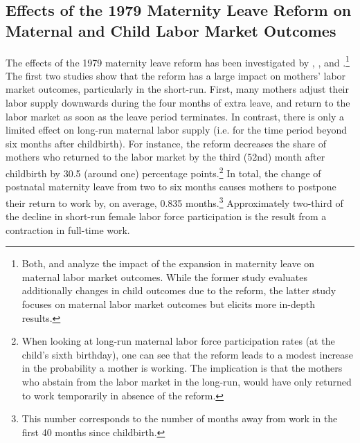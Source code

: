 \documentclass[11pt, a4paper,draft]{article} %
\begin{document}
\subsection[Effects of 1979 Reform on Outcomes]{Effects of the 1979 Maternity Leave Reform on Maternal and Child Labor Market Outcomes}
The effects of the 1979 maternity leave reform has been investigated by \cite{Dustmann2012}, \cite{schonberg2014expansions}, and \cite{guertzgen2018}.\footnote{Both, \cite{Dustmann2012} and \cite{schonberg2014expansions} analyze the impact of the expansion in maternity leave on maternal labor market outcomes. While the former study evaluates additionally changes in child outcomes due to the reform, the latter study focuses on maternal labor market outcomes but elicits more in-depth results.} The first two studies show that the reform has a large impact on mothers' labor market outcomes, particularly in the short-run. \newline First, many mothers adjust their labor supply downwards during the four months of extra leave, and return to the labor market as soon as the leave period terminates. In contrast, there is only a limited effect on long-run maternal labor supply (i.e. for the time period beyond six months after childbirth). For instance, the reform decreases the share of mothers who returned to the labor market by the third (52nd) month after childbirth by 30.5 (around one) percentage points.\footnote{When looking at long-run maternal labor force participation rates (at the child's sixth birthday), one can see that the reform leads to a modest increase in the probability a mother is working. The implication is that the mothers who abstain from the labor market in the long-run, would have only returned to work temporarily in absence of the reform.}
In total, the change of postnatal maternity leave from two to six months causes mothers to postpone their return to work by, on average, 0.835 months.\footnote{This number corresponds to the number of months away from work in the first 40 months since childbirth.} Approximately two-third of the decline in short-run female labor force participation is the result from a contraction in full-time work. \newline
\end{document}
